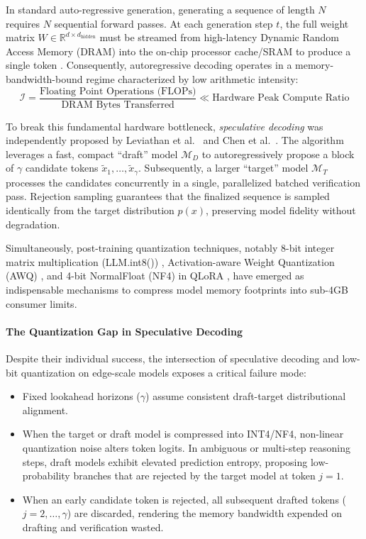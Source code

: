 \documentclass[10pt,twocolumn,letterpaper]{article}
\begin{document}
In standard auto-regressive generation, generating a sequence of length $N$ requires $N$ sequential forward passes. At each generation step $t$, the full weight matrix $W \in \mathbb{R}^{d \times d_{\text{hidden}}}$ must be streamed from high-latency Dynamic Random Access Memory (DRAM) into the on-chip processor cache/SRAM to produce a single token \cite{pope2023efficiently}. Consequently, autoregressive decoding operates in a memory-bandwidth-bound regime characterized by low arithmetic intensity:
\begin{equation}
\mathcal{I} = \frac{\text{Floating Point Operations (FLOPs)}}{\text{DRAM Bytes Transferred}} \ll \text{Hardware Peak Compute Ratio}
\end{equation}

To break this fundamental hardware bottleneck, \textit{speculative decoding} was independently proposed by Leviathan et al.~\cite{leviathan2023fast} and Chen et al.~\cite{chen2023accelerating}. The algorithm leverages a fast, compact ``draft'' model $\mathcal{M}_D$ to autoregressively propose a block of $\gamma$ candidate tokens $\tilde{x}_1, \dots, \tilde{x}_\gamma$. Subsequently, a larger ``target'' model $\mathcal{M}_T$ processes the candidates concurrently in a single, parallelized batched verification pass. Rejection sampling guarantees that the finalized sequence is sampled identically from the target distribution $p(x)$, preserving model fidelity without degradation.

Simultaneously, post-training quantization techniques, notably 8-bit integer matrix multiplication (LLM.int8()) \cite{dettmers2022llm}, Activation-aware Weight Quantization (AWQ) \cite{lin2024awq}, and 4-bit NormalFloat (NF4) in QLoRA \cite{dettmers2023qlora}, have emerged as indispensable mechanisms to compress model memory footprints into sub-4GB consumer limits.

\paragraph{The Quantization Gap in Speculative Decoding}
Despite their individual success, the intersection of speculative decoding and low-bit quantization on edge-scale models exposes a critical failure mode:
\begin{itemize}
    \item Fixed lookahead horizons ($\gamma$) assume consistent draft-target distributional alignment.
    \item When the target or draft model is compressed into INT4/NF4, non-linear quantization noise alters token logits. In ambiguous or multi-step reasoning steps, draft models exhibit elevated prediction entropy, proposing low-probability branches that are rejected by the target model at token $j=1$.
    \item When an early candidate token is rejected, all subsequent drafted tokens ($j=2, \dots, \gamma$) are discarded, rendering the memory bandwidth expended on drafting and verification wasted.
\end{itemize}
\end{document}
